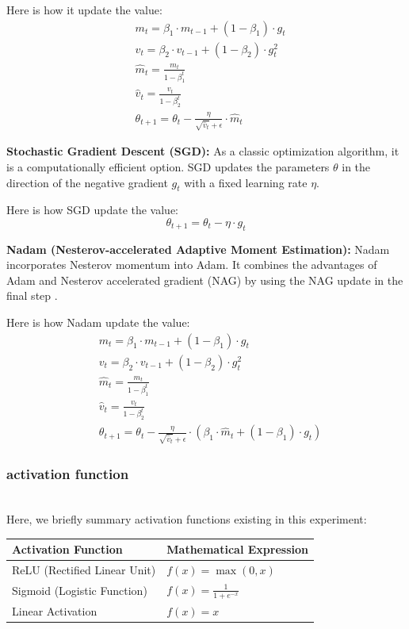 \documentclass[manuscript,screen,review,nonacm]{acmart}
\begin{document}
Here is how it update the value:
\begin{align*}
     & m_t = \beta_1 \cdot m_{t-1} + (1 - \beta_1) \cdot g_t \\
     & v_t = \beta_2 \cdot v_{t-1} + (1 - \beta_2) \cdot g_t^2 \\
     & \hat{m}_t = \frac{m_t}{1 - \beta_1^t} \\
     & \hat{v}_t = \frac{v_t}{1 - \beta_2^t} \\
     & \theta_{t+1} = \theta_t - \frac{\eta}{\sqrt{\hat{v}_t} + \epsilon} \cdot \hat{m}_t
\end{align*}

\textbf{Stochastic Gradient Descent (SGD):} As a classic optimization algorithm, it is a computationally efficient option. SGD updates the parameters $\theta$ in the direction of the negative gradient $g_t$ with a fixed learning rate $\eta$.

Here is how SGD update the value:
\begin{equation*}
\theta_{t+1} = \theta_t - \eta \cdot g_t
\end{equation*}

\textbf{Nadam (Nesterov-accelerated Adaptive Moment Estimation):} Nadam incorporates Nesterov momentum into Adam. It combines the advantages of Adam and Nesterov accelerated gradient (NAG) by using the NAG update in the final step \citep{dozat2016incorporating}.

Here is how Nadam update the value:
\begin{align*}
     & m_t = \beta_1 \cdot m_{t-1} + (1 - \beta_1) \cdot g_t \\
     & v_t = \beta_2 \cdot v_{t-1} + (1 - \beta_2) \cdot g_t^2 \\
     & \hat{m}_t = \frac{m_t}{1 - \beta_1^t} \\
     & \hat{v}_t = \frac{v_t}{1 - \beta_2^t} \\
     & \theta_{t+1} = \theta_t - \frac{\eta}{\sqrt{\hat{v}_t} + \epsilon} \cdot (\beta_1 \cdot \hat{m}_t + (1 - \beta_1) \cdot g_t)
\end{align*}

\subsubsection{activation function}
\hfill\\
Here, we briefly summary activation functions existing in this experiment:
\begin{center}
  \begin{tabular}{|l|l|}
    \hline
    \textbf{Activation Function} & \textbf{Mathematical Expression} \\
    \hline
    ReLU (Rectified Linear Unit) & $f(x) = \max(0, x)$ \\
    \hline
    Sigmoid (Logistic Function) & $f(x) = \frac{1}{1 + e^{-x}}$ \\
    \hline
    Linear Activation & $f(x) = x$ \\
    \hline
  \end{tabular}
\end{center}
\end{document}
